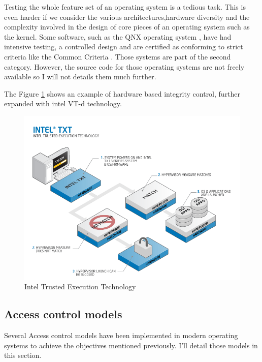 \documentclass[pdftex,a4paper,titlepage,11pt]{article}
\begin{document}
\bigskip

Testing the whole feature set of an operating system is a tedious task. This is even harder if we consider the various architectures,hardware diversity and the complexity involved in the design of core pieces of an operating system such as the kernel. Some software, such as the QNX operating system \cite{QNX}, have had intensive testing, a controlled design and are certified as conforming to strict criteria like the Common Criteria \cite{CCCERT}. Those systems are part of the second category. However, the source code for those operating systems are not freely available so I will not details them much further.

\bigskip

The Figure \ref{INTELTXT} shows an example of hardware based integrity control, further expanded with intel VT-d technology.

\begin{figure}[h]
	\centering
	\includegraphics[scale=0.70]{techrefresh-info-txtfull.png}
	\caption{Intel Trusted Execution Technology}
	\label{INTELTXT}
\end{figure}

\subsection{Access control models}

Several Access control models have been implemented in modern operating systems to achieve the objectives mentioned previously. I'll detail those models in this section.
\end{document}
